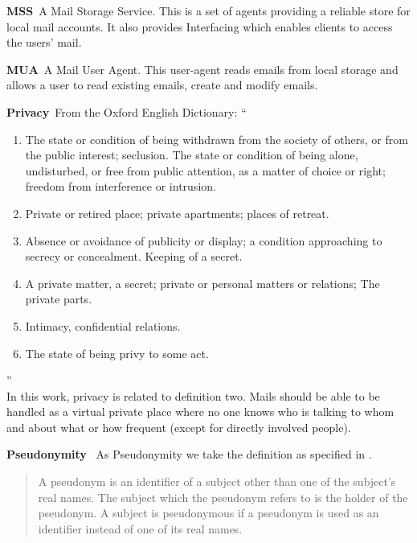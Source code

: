\documentclass[a4paper,appendixprefix,pdfusetitle,twocolumn,fontsize=8pt,draft,DIV=calc,8pt]{\doctype} %
\newenvironment{entry}{\par\leavevmode\hangpara{1.5mm}{1}\ignorespaces}{\RaggedRight\par}
\newcommand*{\mainentry}[2]{{\bfseries{#1\label{def:#1}}}~#2\par}
\begin{document}
\begin{entry}
	\mainentry{MSS}{A Mail Storage Service. This is a set of agents providing a reliable store for local mail accounts. It also provides Interfacing which enables clients to access the users' mail.}
\end{entry}

\begin{entry}
	\mainentry{MUA}{A Mail User Agent. This user-agent reads emails from local storage and allows a user to read existing emails, create and modify emails.}
\end{entry}

\begin{entry}
	\mainentry{Privacy}{From the Oxford English Dictionary: ``
		\begin{enumerate}
			\item The state or condition of being withdrawn from the society of others, or from the public interest; seclusion. The state or condition of being alone, undisturbed, or free from public attention, as a matter of choice or right; freedom from interference or intrusion.
			\item Private or retired place; private apartments; places of retreat.
			\item Absence or avoidance of publicity or display; a condition approaching to secrecy or concealment. Keeping of a secret.
			\item A private matter, a secret; private or personal matters or relations; The private parts.
			\item Intimacy, confidential relations.
			\item The state of being privy to some act.
		\end{enumerate}''\cite{OXFORD}\\
		In this work, privacy is related to definition two. Mails should be able to be handled as a virtual private place where no one knows who is talking to whom and about what or how frequent (except for directly involved people).
	}
\end{entry}

\begin{entry}
	\mainentry{Pseudonymity}{
		As Pseudonymity we take the definition as specified in \cite{anonTerminology}.
		\begin{quote}
			A pseudonym is an identifier of a subject other than one of the subject's real names. The subject which the pseudonym refers to is the holder of the pseudonym. A subject is pseudonymous if a pseudonym is used as an identifier instead of one of its real names.\omitted
		\end{quote}
	}
\end{entry}
\end{document}
